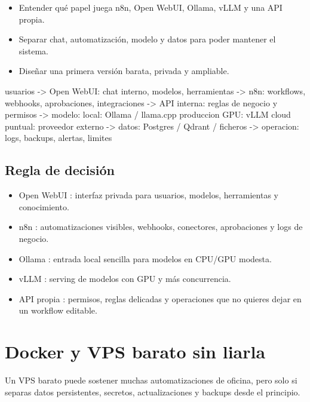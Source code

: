 \documentclass[11pt,a4paper]{book}
\begin{document}
\begin{itemize}\item Entender qué papel juega n8n, Open WebUI, Ollama, vLLM y una API propia.\end{itemize}
\begin{itemize}\item Separar chat, automatización, modelo y datos para poder mantener el sistema.\end{itemize}
\begin{itemize}\item Diseñar una primera versión barata, privada y ampliable.\end{itemize}
\begin{codebox}
usuarios
  -> Open WebUI: chat interno, modelos, herramientas
  -> n8n: workflows, webhooks, aprobaciones, integraciones
  -> API interna: reglas de negocio y permisos
  -> modelo:
       local: Ollama / llama.cpp
       produccion GPU: vLLM
       cloud puntual: proveedor externo
  -> datos:
       Postgres / Qdrant / ficheros
  -> operacion:
       logs, backups, alertas, limites
\end{codebox}
\section{Regla de decisión}
\begin{itemize}\item Open WebUI : interfaz privada para usuarios, modelos, herramientas y conocimiento.\end{itemize}
\begin{itemize}\item n8n : automatizaciones visibles, webhooks, conectores, aprobaciones y logs de negocio.\end{itemize}
\begin{itemize}\item Ollama : entrada local sencilla para modelos en CPU/GPU modesta.\end{itemize}
\begin{itemize}\item vLLM : serving de modelos con GPU y más concurrencia.\end{itemize}
\begin{itemize}\item API propia : permisos, reglas delicadas y operaciones que no quieres dejar en un workflow editable.\end{itemize}
\chapter{Docker y VPS barato sin liarla}
Un VPS barato puede sostener muchas automatizaciones de oficina, pero solo si separas datos persistentes, secretos, actualizaciones y backups desde el principio.
\end{document}
